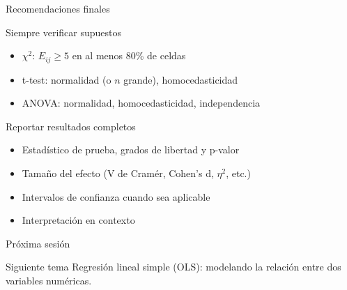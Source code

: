 \documentclass[aspectratio=169, 11pt]{beamer}
\begin{document}
\begin{frame}{Recomendaciones finales}
\begin{alertblock}{Siempre verificar supuestos}
\begin{itemize}
  \item $\chi^2$: $E_{ij} \geq 5$ en al menos 80\% de celdas
  \item t-test: normalidad (o $n$ grande), homocedasticidad
  \item ANOVA: normalidad, homocedasticidad, independencia
\end{itemize}
\end{alertblock}

\begin{block}{Reportar resultados completos}
\begin{itemize}
  \item Estadístico de prueba, grados de libertad y p-valor
  \item Tamaño del efecto (V de Cramér, Cohen's d, $\eta^2$, etc.)
  \item Intervalos de confianza cuando sea aplicable
  \item Interpretación en contexto
\end{itemize}
\end{block}
\end{frame}

\begin{frame}{Próxima sesión}
\begin{exampleblock}{Siguiente tema}
Regresión lineal simple (OLS): modelando la relación entre dos variables numéricas.
\end{exampleblock}
\end{frame}
\end{document}
